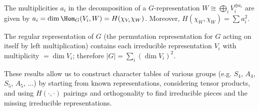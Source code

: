 \documentclass{notes}
\begin{document}
\begin{theorem}
    The multiplicities $a_i$ in the decomposition of a $G$-representation $W\cong \bigoplus_iV_i^{\oplus a_i}$ are given by $a_i=\dim \Hom _G(V_i,W)=H(\chi _{V_i}\chi _W) $. Moreover, $H(\chi _W,\chi _W)=\sum a_i^2$.
\end{theorem}

\begin{corollary}
    The regular representation of $G$ (the permutation representation for $G$ acting on itself by left multiplication) contains each irreducible representation $V_i$ with multiplicity $=\dim V_i$; therefore $|G|=\sum _i\left( \dim V_i \right) ^2 $.
\end{corollary}

\begin{fact}
    These results allow us to construct character tables of various groups (e.g. $S_4$, $A_4$, $S_5$, $A_5$, $\ldots $) by starting from known representations, considering tensor products, and using $H(\cdot ,\cdot )$ pairings and orthogonality to find irreducible pieces and the missing irreducible representations.
\end{fact}
\end{document}
